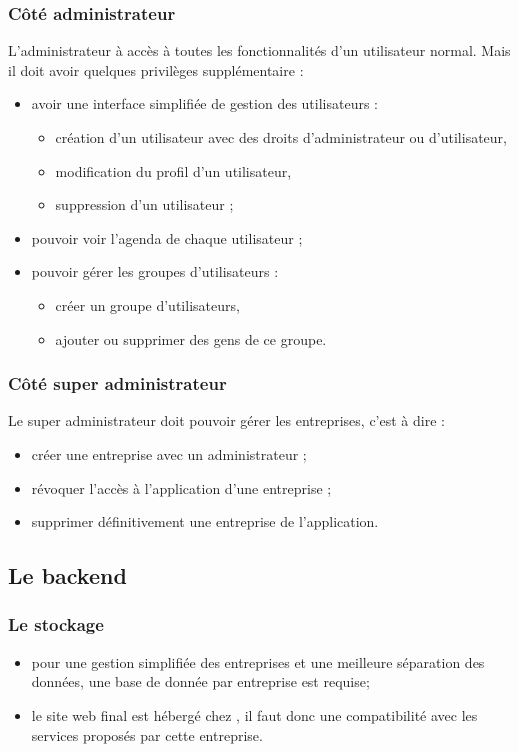 \documentclass[a4paper, 11pt]{report}
\begin{document}
        \subsubsection{Côté administrateur}
        L'administrateur à accès à toutes les fonctionnalités d'un utilisateur normal. Mais il doit avoir quelques privilèges supplémentaire :
        \begin{itemize}
            \item avoir une interface simplifiée de gestion des utilisateurs :
            \begin{itemize}
                \item création d'un utilisateur avec des droits d'administrateur ou d'utilisateur,
                \item modification du profil d'un utilisateur,
                \item suppression d'un utilisateur ;
            \end{itemize}
            \item pouvoir voir l'agenda de chaque utilisateur ;
            \item pouvoir gérer les groupes d'utilisateurs :
            \begin{itemize}
                \item créer un groupe d'utilisateurs,
                \item ajouter ou supprimer des gens de ce groupe.
            \end{itemize}
        \end{itemize}
        \subsubsection{Côté super administrateur}
        Le super administrateur doit pouvoir gérer les entreprises, c'est à dire :
        \begin{itemize}
            \item créer une entreprise avec un administrateur ;
            \item révoquer l'accès à l'application d'une entreprise ;
            \item supprimer définitivement une entreprise de l'application.
        \end{itemize}
    \subsection{Le backend}
        \subsubsection{Le stockage}
        \begin{itemize}
            \item pour une gestion simplifiée des entreprises et une meilleure séparation des données, une base de donnée par entreprise est requise;
            \item  le site web final est hébergé chez \oswitch, il faut donc une compatibilité avec les services proposés par cette entreprise.
        \end{itemize}
\end{document}
